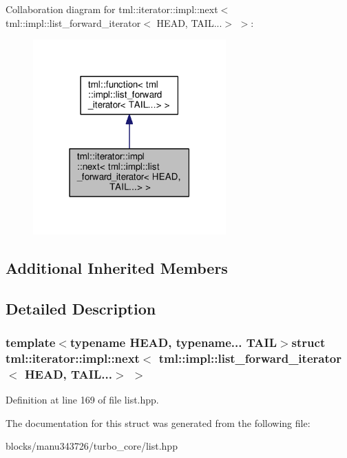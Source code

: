 Collaboration diagram for tml\+:\+:iterator\+:\+:impl\+:\+:next$<$ tml\+:\+:impl\+:\+:list\+\_\+forward\+\_\+iterator$<$ H\+E\+A\+D, T\+A\+I\+L...$>$ $>$\+:
\nopagebreak
\begin{figure}[H]
\begin{center}
\leavevmode
\includegraphics[width=210pt]{structtml_1_1iterator_1_1impl_1_1next_3_01tml_1_1impl_1_1list__forward__iterator_3_01_h_e_a_d_00510b816368f7c197a82a89ae6b713a03}
\end{center}
\end{figure}
\subsection*{Additional Inherited Members}


\subsection{Detailed Description}
\subsubsection*{template$<$typename H\+E\+A\+D, typename... T\+A\+I\+L$>$struct tml\+::iterator\+::impl\+::next$<$ tml\+::impl\+::list\+\_\+forward\+\_\+iterator$<$ H\+E\+A\+D, T\+A\+I\+L...$>$ $>$}



Definition at line 169 of file list.\+hpp.



The documentation for this struct was generated from the following file\+:\begin{DoxyCompactItemize}
\item 
blocks/manu343726/turbo\+\_\+core/list.\+hpp\end{DoxyCompactItemize}
